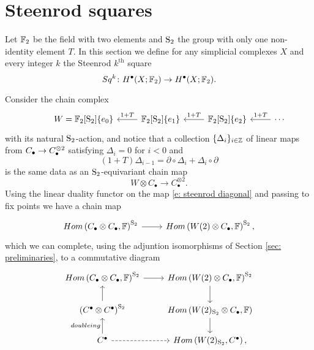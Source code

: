 
\section{Steenrod squares} \label{s:steenrod_squares}

Let $\F_2$ be the field with two elements and $\S_2$ the group with only one non-identity element $T$.
In this section we define for any simplicial complexes $X$ and every integer $k$ the Steenrod $k^{\mathrm{th}}$ square
\begin{equation*}
Sq^k \colon H^\bullet(X; \F_2) \to H^{\bullet}(X; \F_2).
\end{equation*}

Consider the chain complex
\begin{equation*}
\begin{tikzcd}[column sep=normal]
& W =  \F_2[\S_2]\{e_0\} & \arrow[l, "1+T"'] \F_2[\S_2]\{e_1\} & \arrow[l, "1+T"']
\F_2[\S_2]\{e_2\} & \arrow[l, "1+T"'] \cdots
\end{tikzcd}
\end{equation*}
with its natural $\S_2$-action, and notice that a collection $\{\Delta_i\}_{i\in \Z}$ of linear maps from $\chains \to \chains^{\otimes 2}$ satisfying $\Delta_i = 0$ for $i < 0$ and
\begin{equation*}
(1 + T) \Delta_{i-1} = \partial \circ \Delta_i + \Delta_i \circ \partial
\end{equation*}
is the same data as an $\S_2$-equivariant chain map
\begin{equation} \label{e: steenrod diagonal}
W \otimes C_\bullet \to C_\bullet^{\otimes 2}.
\end{equation}
Using the linear duality functor on the map \eqref{e: steenrod diagonal} and passing to fix points we have a chain map
\begin{equation*}
\begin{tikzcd}
Hom\left(C_\bullet \otimes C_\bullet, \F \right)^{\mathrm S_2} \arrow[r] &
Hom\left(W(2) \otimes C_\bullet, \F \right)^{\mathrm S_2},
\end{tikzcd}
\end{equation*}
which we can complete, using the adjuntion isomorphisms of Section \ref{sec: preliminaries}, to a commutative diagram
\begin{equation*}
\begin{tikzcd}
Hom\left(C_\bullet \otimes C_\bullet, \F \right)^{\mathrm S_2} \arrow[r] &
Hom\left(W(2) \otimes C_\bullet, \F \right)^{\mathrm S_2} \arrow[d] \\
\left(C^\bullet \otimes C^\bullet\right)^{\mathrm S_2} \arrow[u]&
Hom\left(W(2)_{\mathrm S_2} \otimes C_\bullet, \F \right) \arrow[d] \\
C^\bullet \arrow[u, "doubleing"] \arrow[r, dashed]&
Hom\left(W(2)_{\mathrm S_2}, C^\bullet\right),
\end{tikzcd}
\end{equation*}
